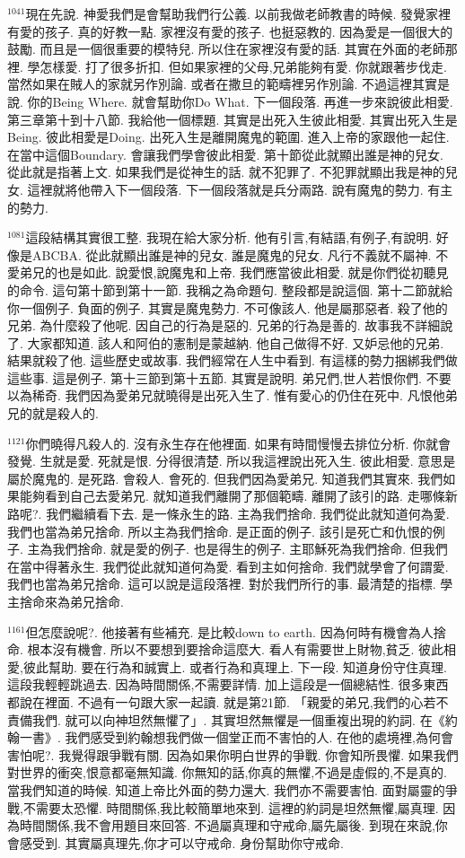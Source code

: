 \documentclass{book}
\begin{document}
$^{1041}$現在先說.
神愛我們是會幫助我們行公義.
以前我做老師教書的時候.
發覺家裡有愛的孩子.
真的好教一點.
家裡沒有愛的孩子.
也挺惡教的.
因為愛是一個很大的鼓勵.
而且是一個很重要的模特兒.
所以住在家裡沒有愛的話.
其實在外面的老師那裡.
學怎樣愛.
打了很多折扣.
但如果家裡的父母,兄弟能夠有愛.
你就跟著步伐走.
當然如果在賊人的家就另作別論.
或者在撒旦的範疇裡另作別論.
不過這裡其實是說.
你的Being Where.
就會幫助你Do What.
下一個段落.
再進一步來說彼此相愛.
第三章第十到十八節.
我給他一個標題.
其實是出死入生彼此相愛.
其實出死入生是Being.
彼此相愛是Doing.
出死入生是離開魔鬼的範圍.
進入上帝的家跟他一起住.
在當中這個Boundary.
會讓我們學會彼此相愛.
第十節從此就顯出誰是神的兒女.
從此就是指著上文.
如果我們是從神生的話.
就不犯罪了.
不犯罪就顯出我是神的兒女.
這裡就將他帶入下一個段落.
下一個段落就是兵分兩路.
說有魔鬼的勢力.
有主的勢力.

$^{1081}$這段結構其實很工整.
我現在給大家分析.
他有引言,有結語,有例子,有說明.
好像是ABCBA.
從此就顯出誰是神的兒女.
誰是魔鬼的兒女.
凡行不義就不屬神.
不愛弟兄的也是如此.
說愛恨,說魔鬼和上帝.
我們應當彼此相愛.
就是你們從初聽見的命令.
這句第十節到第十一節.
我稱之為命題句.
整段都是說這個.
第十二節就給你一個例子.
負面的例子.
其實是魔鬼勢力.
不可像該人.
他是屬那惡者.
殺了他的兄弟.
為什麼殺了他呢.
因自己的行為是惡的.
兄弟的行為是善的.
故事我不詳細說了.
大家都知道.
該人和阿伯的憲制是蒙越納.
他自己做得不好.
又妒忌他的兄弟.
結果就殺了他.
這些歷史或故事.
我們經常在人生中看到.
有這樣的勢力捆綁我們做這些事.
這是例子.
第十三節到第十五節.
其實是說明.
弟兄們,世人若恨你們.
不要以為稀奇.
我們因為愛弟兄就曉得是出死入生了.
惟有愛心的仍住在死中.
凡恨他弟兄的就是殺人的.

$^{1121}$你們曉得凡殺人的.
沒有永生存在他裡面.
如果有時間慢慢去排位分析.
你就會發覺.
生就是愛.
死就是恨.
分得很清楚.
所以我這裡說出死入生.
彼此相愛.
意思是屬於魔鬼的.
是死路.
會殺人.
會死的.
但我們因為愛弟兄.
知道我們其實來.
我們如果能夠看到自己去愛弟兄.
就知道我們離開了那個範疇.
離開了該引的路.
走哪條新路呢?.
我們繼續看下去.
是一條永生的路.
主為我們捨命.
我們從此就知道何為愛.
我們也當為弟兄捨命.
所以主為我們捨命.
是正面的例子.
該引是死亡和仇恨的例子.
主為我們捨命.
就是愛的例子.
也是得生的例子.
主耶穌死為我們捨命.
但我們在當中得著永生.
我們從此就知道何為愛.
看到主如何捨命.
我們就學會了何謂愛.
我們也當為弟兄捨命.
這可以說是這段落裡.
對於我們所行的事.
最清楚的指標.
學主捨命來為弟兄捨命.

$^{1161}$但怎麼說呢?.
他接著有些補充.
是比較down to earth.
因為何時有機會為人捨命.
根本沒有機會.
所以不要想到要捨命這麼大.
看人有需要世上財物,貧乏.
彼此相愛,彼此幫助.
要在行為和誠實上.
或者行為和真理上.
下一段.
知道身份守住真理.
這段我輕輕跳過去.
因為時間關係,不需要詳情.
加上這段是一個總結性.
很多東西都說在裡面.
不過有一句跟大家一起讀.
就是第21節.
「親愛的弟兄,我們的心若不責備我們.
就可以向神坦然無懼了」.
其實坦然無懼是一個重複出現的約詞.
在《約翰一書》.
我們感受到約翰想我們做一個堂正而不害怕的人.
在他的處境裡,為何會害怕呢?.
我覺得跟爭戰有關.
因為如果你明白世界的爭戰.
你會知所畏懼.
如果我們對世界的衝突,恨意都毫無知識.
你無知的話,你真的無懼,不過是虛假的,不是真的.
當我們知道的時候.
知道上帝比外面的勢力還大.
我們亦不需要害怕.
面對屬靈的爭戰,不需要太恐懼.
時間關係,我比較簡單地來到.
這裡的約詞是坦然無懼,屬真理.
因為時間關係,我不會用題目來回答.
不過屬真理和守戒命,屬先屬後.
到現在來說,你會感受到.
其實屬真理先,你才可以守戒命.
身份幫助你守戒命.
\end{document}
